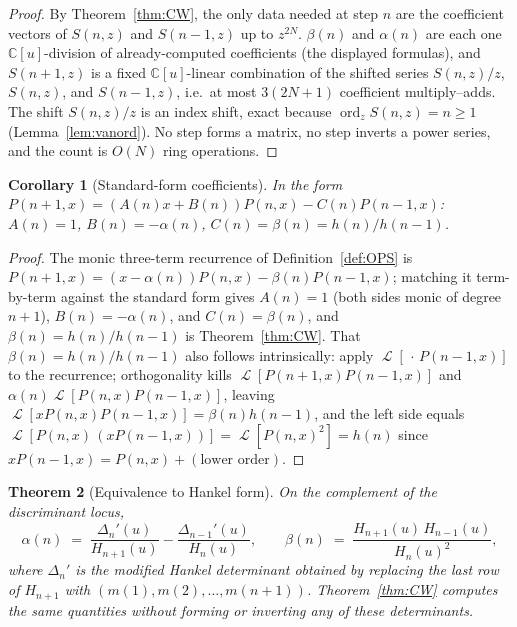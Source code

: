 \documentclass[11pt]{article}
\newtheorem{theorem}{Theorem}[section]
\newtheorem{corollary}[theorem]{Corollary}
\theoremstyle{definition}
\DeclareMathOperator{\Lop}{\mathcal{L}}
\DeclareMathOperator{\ord}{ord}
\begin{document}
\begin{proof}
By Theorem~\ref{thm:CW}, the only data needed at step $n$ are the
coefficient vectors of $S(n,z)$ and $S(n-1,z)$ up to $z^{2N}$.
$\beta(n)$ and $\alpha(n)$ are each one $\mathbb{C}[u]$-division of
already-computed coefficients (the displayed formulas), and
$S(n+1,z)$ is a fixed $\mathbb{C}[u]$-linear combination of the
shifted series $S(n,z)/z$, $S(n,z)$, and $S(n-1,z)$, i.e.\ at most
$3(2N+1)$ coefficient multiply--adds. The shift $S(n,z)/z$ is an
index shift, exact because $\ord_{z} S(n,z) = n \geq 1$
(Lemma~\ref{lem:vanord}). No step forms a matrix, no step inverts a
power series, and the count is $O(N)$ ring operations.
\end{proof}

\begin{corollary}[Standard-form coefficients]\label{cor:ABC}
In the form $P(n+1,x) = (A(n)x + B(n)) P(n,x) - C(n) P(n-1,x)$:
$A(n)=1$, $B(n) = -\alpha(n)$, $C(n) = \beta(n) = h(n)/h(n-1)$.
\end{corollary}

\begin{proof}
The monic three-term recurrence of Definition~\ref{def:OPS} is
$P(n+1,x) = (x - \alpha(n))P(n,x) - \beta(n)P(n-1,x)$; matching it
term-by-term against the standard form gives $A(n) = 1$ (both sides
monic of degree $n+1$), $B(n) = -\alpha(n)$, and $C(n) = \beta(n)$,
and $\beta(n) = h(n)/h(n-1)$ is Theorem~\ref{thm:CW}. That
$\beta(n) = h(n)/h(n-1)$ also follows intrinsically: apply
$\Lop[\,\cdot\,P(n-1,x)]$ to the recurrence; orthogonality kills
$\Lop[P(n+1,x)P(n-1,x)]$ and $\alpha(n)\Lop[P(n,x)P(n-1,x)]$, leaving
$\Lop[xP(n,x)P(n-1,x)] = \beta(n)h(n-1)$, and the left side equals
$\Lop[P(n,x)\,(xP(n-1,x))] = \Lop[P(n,x)^{2}] = h(n)$ since
$xP(n-1,x) = P(n,x) + (\text{lower order})$.
\end{proof}

\begin{theorem}[Equivalence to Hankel form]\label{thm:hankelequiv}
On the complement of the discriminant locus,
\[
\alpha(n) \;=\; \frac{\Delta_{n}'(u)}{H_{n+1}(u)} - \frac{\Delta_{n-1}'(u)}{H_{n}(u)},
\qquad
\beta(n) \;=\; \frac{H_{n+1}(u)\, H_{n-1}(u)}{H_{n}(u)^{2}},
\]
where $\Delta_{n}'$ is the modified Hankel determinant obtained by
replacing the last row of $H_{n+1}$ with $(m(1),m(2),\ldots,m(n+1))$.
Theorem~\ref{thm:CW} computes the same quantities without forming or
inverting any of these determinants.
\end{theorem}
\end{document}
